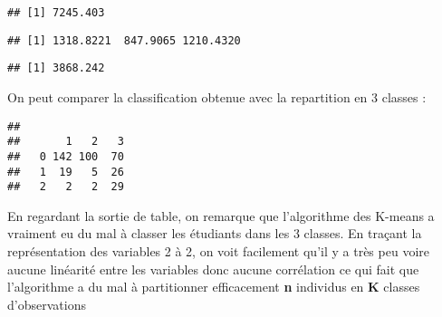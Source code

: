 \documentclass[
]{article}
\newenvironment{Shaded}{\begin{snugshade}}{\end{snugshade}}
\newcommand{\CommentTok}[1]{\textcolor[rgb]{0.56,0.35,0.01}{\textit{#1}}}
\newcommand{\FunctionTok}[1]{\textcolor[rgb]{0.00,0.00,0.00}{#1}}
\newcommand{\NormalTok}[1]{#1}
\newcommand{\SpecialCharTok}[1]{\textcolor[rgb]{0.00,0.00,0.00}{#1}}
\begin{document}
\begin{Shaded}
\end{Shaded}

\begin{verbatim}
## [1] 7245.403
\end{verbatim}

\begin{Shaded}
\end{Shaded}

\begin{verbatim}
## [1] 1318.8221  847.9065 1210.4320
\end{verbatim}

\begin{Shaded}
\end{Shaded}

\begin{verbatim}
## [1] 3868.242
\end{verbatim}

On peut comparer la classification obtenue avec la repartition en 3
classes :

\begin{Shaded}
\end{Shaded}

\begin{verbatim}
##    
##       1   2   3
##   0 142 100  70
##   1  19   5  26
##   2   2   2  29
\end{verbatim}

En regardant la sortie de table, on remarque que l'algorithme des
K-means a vraiment eu du mal à classer les étudiants dans les 3 classes.
En traçant la représentation des variables 2 à 2, on voit facilement
qu'il y a très peu voire aucune linéarité entre les variables donc
aucune corrélation ce qui fait que l'algorithme a du mal à partitionner
efficacement \textbf{n} individus en \textbf{K} classes d'observations
\end{document}
